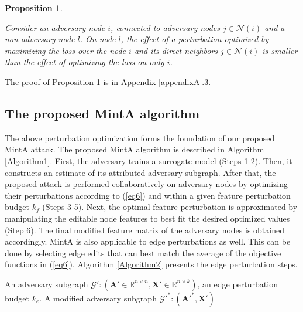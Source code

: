 \documentclass[conference,compsoc]{IEEEtran}
\newtheorem{prop}{Proposition}
\begin{document}

\begin{prop}
\label{prop1}
\par Consider an adversary node $i$, connected to adversary nodes $j \in \mathcal{N}(i)$ and a non-adversary node $l$. On node $l$, the effect of a perturbation optimized by maximizing the loss over the node $i$ and its direct neighbors $j \in \mathcal{N}(i)$ is smaller than the effect of optimizing the loss on only $i$.
\end{prop}
\noindent The proof of Proposition \ref{prop1} is in Appendix \ref{appendixA}.3.


\subsection{The proposed MintA algorithm}
\par The above perturbation optimization forms the foundation of our proposed MintA attack. The proposed MintA algorithm is described in Algorithm \ref{Algorithm1}. First, the adversary trains a surrogate model (Steps 1-2). Then, it constructs an estimate of its attributed adversary subgraph. After that, the proposed attack is performed collaboratively on adversary nodes by optimizing their perturbations according to (\ref{eq6}) and within a given feature perturbation budget $k_f$ (Steps 3-5). Next, the optimal feature perturbation is approximated by manipulating the editable node features to best fit the desired optimized values (Step 6). The final modified feature matrix of the adversary nodes is obtained accordingly. MintA is also applicable to edge perturbations as well. This can be done by selecting edge edits that can best match the average of the objective functions in (\ref{eq6}). Algorithm \ref{Algorithm2} presents the edge perturbation steps.

\begin{algorithm}[t!]
\caption{MintA-edge perturbation.}
\label{Algorithm2}
\begin{algorithmic}[1]{
\renewcommand{\algorithmicrequire}{\textbf{Input:}} 
\renewcommand{\algorithmicensure}{\textbf{Output:}}
\REQUIRE An adversary subgraph $\mathcal{G'}:(\boldsymbol{A'} \in \mathbb{R}^{n \times n},\boldsymbol{X'} \in \mathbb{R}^{n \times k})$, an edge perturbation budget $k_e$.
\ENSURE A modified adversary subgraph $\mathcal{G'}^*:(\boldsymbol{A'}^*,\boldsymbol{X'})$ 
}
\end{algorithmic}
\end{algorithm}
\end{document}
